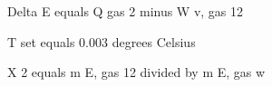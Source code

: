Delta E equals Q gas 2 minus W v, gas 12

T set equals 0.003 degrees Celsius

X 2 equals m E, gas 12 divided by m E, gas w